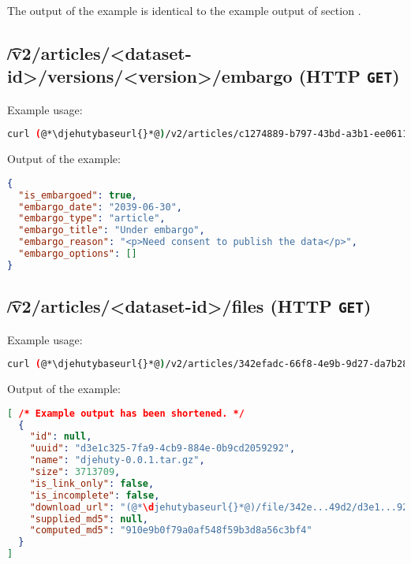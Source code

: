   The output of the example is identical to the example output of section
  .

\subsection{\t{/v2/articles/<dataset-id>/versions/<version>/embargo} (HTTP \texttt{GET})}

  Example usage:
\begin{lstlisting}[language=bash]
curl (@*\djehutybaseurl{}*@)/v2/articles/c1274889-b797-43bd-a3b1-ee0611d58fd7/versions/2/embargo | jq
\end{lstlisting}

  Output of the example:
\begin{lstlisting}[language=JSON]
{
  "is_embargoed": true,
  "embargo_date": "2039-06-30",
  "embargo_type": "article",
  "embargo_title": "Under embargo",
  "embargo_reason": "<p>Need consent to publish the data</p>",
  "embargo_options": []
}
\end{lstlisting}


\subsection{\t{/v2/articles/<dataset-id>/files} (HTTP \texttt{GET})}


  Example usage:
\begin{lstlisting}[language=bash]
curl (@*\djehutybaseurl{}*@)/v2/articles/342efadc-66f8-4e9b-9d27-da7b28b849d2/files
\end{lstlisting}

  Output of the example:
\begin{lstlisting}[language=JSON]
[ /* Example output has been shortened. */
  {
    "id": null,
    "uuid": "d3e1c325-7fa9-4cb9-884e-0b9cd2059292",
    "name": "djehuty-0.0.1.tar.gz",
    "size": 3713709,
    "is_link_only": false,
    "is_incomplete": false,
    "download_url": "(@*\djehutybaseurl{}*@)/file/342e...49d2/d3e1...9292",
    "supplied_md5": null,
    "computed_md5": "910e9b0f79a0af548f59b3d8a56c3bf4"
  }
]
\end{lstlisting}

